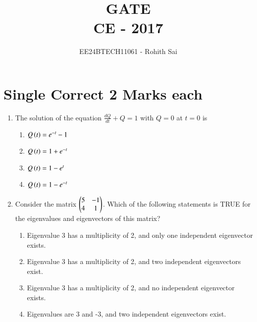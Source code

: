 \documentclass[journal]{IEEEtran}
\begin{document}

\vspace{3cm}

\title{GATE\\CE - 2017}
\author{EE24BTECH11061 - Rohith Sai}
\maketitle

\renewcommand{\thefigure}{\theenumi}
\renewcommand{\thetable}{\theenumi}

\section*{Single Correct 2 Marks each}
\begin{enumerate}
\item The solution of the equation $\frac{dQ}{dt} + Q = 1$ with $Q = 0$ at $t=0$ is
\begin{multicols}{2}
    \begin{enumerate}
        \item $Q\left(t\right) = e^{-t} - 1$
        \item $Q\left(t\right) = 1 + e^{-t}$
        \item $Q\left(t\right) = 1 - e^{t}$
        \item $Q\left(t\right) = 1 - e^{-t}$
    \end{enumerate}
\end{multicols}

\item Consider the matrix $\begin{pmatrix}5 & -1\\4 & 1\end{pmatrix}$. Which of the following statements is TRUE for the eigenvalues and eigenvectors of this matrix?
\begin{multicols}{2}
    \begin{enumerate}
        \item Eigenvalue 3 has a multiplicity of 2, and only one independent eigenvector exists.
        \item Eigenvalue 3 has a multiplicity of 2, and two independent eigenvectors exist.
        \item Eigenvalue 3 has a multiplicity of 2, and no independent eigenvector exists.
        \item Eigenvalues are 3 and -3, and two independent eigenvectors exist.
    \end{enumerate}
\end{multicols}
    

\end{enumerate}
\end{document}
